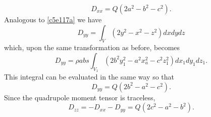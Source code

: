 \begin{enumerate}
\begin{equation}
D_{xx} = Q(2a^2-b^2-c^2).
\end{equation}
Analogous to \eqref{c5e117a} we have
\begin{equation}\label{c5e120a}
D_{yy} = \int_V(2y^2 - x^2 - z^2)dxdydz
\end{equation}
which, upon the same transformation as before, becomes
\[
D_{yy} = \rho abs\int_{V_1}(2b^2y_1^2 - a^2x_a^2 - c^2z_1^2)dx_1dy_1dz_1.
\]
This integral can be evaluated in the same way so that
\begin{equation}\label{c5e121a}
D_{yy} = Q(2b^2 - a^2 - c^2).
\end{equation}
Since the quadrupole moment tensor is traceless,
\begin{equation}\label{c5e122a}
D_{zz} = -D_{xx} - D_{yy} = Q(2c^2 - a^2 - b^2).
\end{equation}
\end{enumerate}